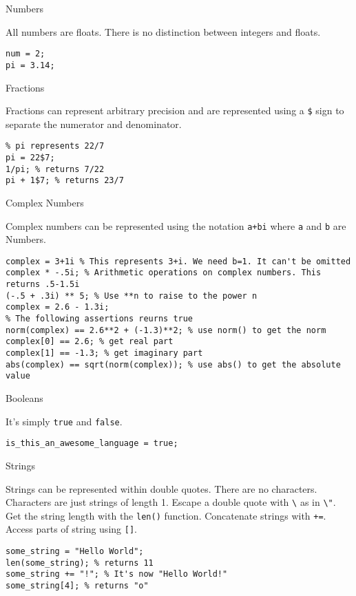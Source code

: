 \documentclass[]{article}
\begin{document}
Numbers

All numbers are floats. There is no distinction between integers and
floats.

\begin{verbatim}
num = 2;
pi = 3.14;
\end{verbatim}

Fractions

Fractions can represent arbitrary precision and are represented using a
\texttt{\$} sign to separate the numerator and denominator.

\begin{verbatim}
% pi represents 22/7
pi = 22$7;
1/pi; % returns 7/22
pi + 1$7; % returns 23/7
\end{verbatim}

Complex Numbers

Complex numbers can be represented using the notation \texttt{a+bi}
where \texttt{a} and \texttt{b} are Numbers.

\begin{verbatim}
complex = 3+1i % This represents 3+i. We need b=1. It can't be omitted
complex * -.5i; % Arithmetic operations on complex numbers. This returns .5-1.5i
(-.5 + .3i) ** 5; % Use **n to raise to the power n
complex = 2.6 - 1.3i;
% The following assertions reurns true
norm(complex) == 2.6**2 + (-1.3)**2; % use norm() to get the norm
complex[0] == 2.6; % get real part
complex[1] == -1.3; % get imaginary part
abs(complex) == sqrt(norm(complex)); % use abs() to get the absolute value
\end{verbatim}

Booleans

It's simply \texttt{true} and \texttt{false}.

\begin{verbatim}
is_this_an_awesome_language = true;
\end{verbatim}

Strings

Strings can be represented within double quotes. There are no
characters. Characters are just strings of length 1. Escape a double
quote with \texttt{\textbackslash{}} as in \texttt{\textbackslash{}"}.
Get the string length with the \texttt{len()} function. Concatenate
strings with \texttt{+=}. Access parts of string using \texttt{{[}{]}}.

\begin{verbatim}
some_string = "Hello World";
len(some_string); % returns 11
some_string += "!"; % It's now "Hello World!"
some_string[4]; % returns "o"
\end{verbatim}
\end{document}
